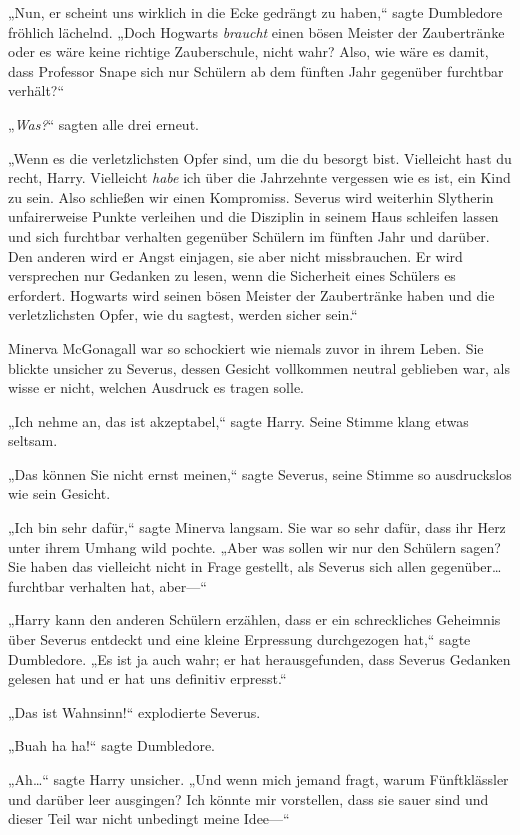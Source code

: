 {„Nun, er scheint uns wirklich in die Ecke gedrängt zu haben,“ sagte Dumbledore fröhlich lächelnd. „Doch Hogwarts \emph{braucht} einen bösen Meister der Zaubertränke oder es wäre keine richtige Zauberschule, nicht wahr? Also, wie wäre es damit, dass Professor Snape sich nur Schülern ab dem fünften Jahr gegenüber furchtbar verhält?“

„\emph{Was?}“ sagten alle drei erneut.

„Wenn es die verletzlichsten Opfer sind, um die du besorgt bist. Vielleicht hast du recht, Harry. Vielleicht \emph{habe} ich über die Jahrzehnte vergessen wie es ist, ein Kind zu sein. Also schließen wir einen Kompromiss. Severus wird weiterhin Slytherin unfairerweise Punkte verleihen und die Disziplin in seinem Haus schleifen lassen und sich furchtbar verhalten gegenüber Schülern im fünften Jahr und darüber. Den anderen wird er Angst einjagen, sie aber nicht missbrauchen. Er wird versprechen nur Gedanken zu lesen, wenn die Sicherheit eines Schülers es erfordert. Hogwarts wird seinen bösen Meister der Zaubertränke haben und die verletzlichsten Opfer, wie du sagtest, werden sicher sein.“

Minerva McGonagall war so schockiert wie niemals zuvor in ihrem Leben. Sie blickte unsicher zu Severus, dessen Gesicht vollkommen neutral geblieben war, als wisse er nicht, welchen Ausdruck es tragen solle.

„Ich nehme an, das ist akzeptabel,“ sagte Harry. Seine Stimme klang etwas seltsam.

„Das können Sie nicht ernst meinen,“ sagte Severus, seine Stimme so ausdruckslos wie sein Gesicht.

„Ich bin sehr dafür,“ sagte Minerva langsam. Sie war so sehr dafür, dass ihr Herz unter ihrem Umhang wild pochte. „Aber was sollen wir nur den Schülern sagen? Sie haben das vielleicht nicht in Frage gestellt, als Severus sich allen gegenüber… furchtbar verhalten hat, aber—“

„Harry kann den anderen Schülern erzählen, dass er ein schreckliches Geheimnis über Severus entdeckt und eine kleine Erpressung durchgezogen hat,“ sagte Dumbledore. „Es ist ja auch wahr; er hat herausgefunden, dass Severus Gedanken gelesen hat und er hat uns definitiv erpresst.“

„Das ist Wahnsinn!“ explodierte Severus.

„Buah ha ha!“ sagte Dumbledore.

„Ah…“ sagte Harry unsicher. „Und wenn mich jemand fragt, warum Fünftklässler und darüber leer ausgingen? Ich könnte mir vorstellen, dass sie sauer sind und dieser Teil war nicht unbedingt meine Idee—“

}
